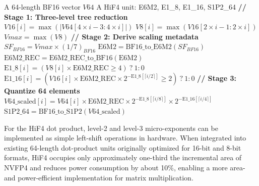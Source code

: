 \documentclass{article}
\begin{document}
\begin{algorithm}[h]
\caption{Conversion from BF16 to HiF4}
\label{alg:bf16-to-hif4}
\begin{algorithmic}[1]
\REQUIRE A 64-length BF16 vector $V64$
\ENSURE A HiF4 unit: E6M2, E1\_8, E1\_16, S1P2\_64
\STATE \textbf{// Stage 1: Three-level tree reduction}
  \STATE $V16[i] = \max(|V64[4 \times i - 3 : 4 \times i]|)$
\ENDFOR
{}
  \STATE $V8[i] = \max(V16[2 \times i - 1 : 2 \times i])$
\ENDFOR
\STATE $Vmax = \max(V8)$
\STATE \textbf{// Stage 2: Derive scaling metadata}
\STATE $SF_{BF16} = Vmax \times (1/7)_{BF16}$
  \hfill{}
\STATE $\text{E6M2} = \text{BF16\_to\_E6M2}(SF_{BF16})$
  \hfill{}
\STATE $\text{E6M2\_REC} = \text{E6M2\_REC\_to\_BF16}(\text{E6M2})$
  \hfill{}
\STATE $\text{E1\_8}[i] = (V8[i] \times \text{E6M2\_REC} \geq 4)\ ?\ 1 : 0$
  \hfill{}
  \STATE $\text{E1\_16}[i] = (V16[i] \times \text{E6M2\_REC} \times 2^{-\text{E1\_8}[\lceil i/2 \rceil]} \geq 2)\ ?\ 1 : 0$
\ENDFOR
\STATE \textbf{// Stage 3: Quantize 64 elements}
  \STATE $V64\_\text{scaled}[i] = V64[i] \times \text{E6M2\_REC} \times 2^{-\text{E1\_8}[\lceil i/8 \rceil]} \times 2^{-\text{E1\_16}[\lceil i/4 \rceil]}$
\ENDFOR
\STATE $\text{S1P2\_64} = \text{BF16\_to\_S1P2}(V64\_\text{scaled})$
  \hfill{}
\end{algorithmic}
\end{algorithm}

For the HiF4 dot product, level-2 and level-3 micro-exponents can be
implemented as simple left-shift operations in hardware. When integrated into
existing 64-length dot-product units originally optimized for 16-bit and 8-bit
formats, HiF4 occupies only approximately one-third the incremental area of
NVFP4 and reduces power consumption by about 10\%, enabling a more area- and
power-efficient implementation for matrix multiplication.



\newpage

\end{document}
